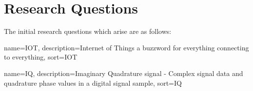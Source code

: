 %
%
\newpage
\section*{Research Questions}
The initial research questions which arise are as follows:

%
{
  name={IOT},
  description={Internet of Things a buzzword for everything connecting to everything},
  sort=IOT
}

{
  name={IQ},
  description={Imaginary Quadrature signal - Complex signal data and quadrature phase values in a digital signal sample},
  sort=IQ
}
%

